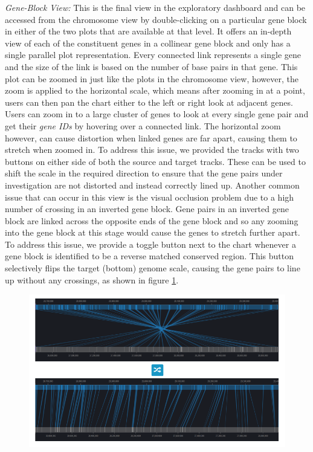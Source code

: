 \textit{Gene-Block View:} This is the final view in the exploratory dashboard and can be accessed from the chromosome view by double-clicking on a particular gene block in either of the two plots that are available at that level. It offers an in-depth view of each of the constituent genes in a collinear gene block and only has a single parallel plot representation. Every connected link represents a single gene and the size of the link is based on the number of base pairs in that gene. This plot can be zoomed in just like the plots in the chromosome view, however, the zoom is applied to the horizontal scale, which means after zooming in at a point, users can then pan the chart either to the left or right look at adjacent genes. Users can zoom in to a large cluster of genes to look at every single gene pair and get their \textit{gene IDs} by hovering over a connected link. The horizontal zoom however, can cause distortion when linked genes are far apart, causing them to stretch when zoomed in. To address this issue, we provided the tracks with two buttons on either side of both the source and target tracks. These can be used to shift the scale in the required direction to ensure that the gene pairs under investigation are not distorted and instead correctly lined up. Another common issue that can occur in this view is the visual occlusion problem due to a high number of crossing in an inverted gene block. Gene pairs in an inverted gene block are linked across the opposite ends of the gene block and so any zooming into the gene block at this stage would cause the genes to stretch further apart. To address this issue, we provide a toggle button next to the chart whenever a gene block is identified to be a reverse matched conserved region. This button selectively flips the target (bottom) genome scale, causing the gene pairs to line up without any crossings, as shown in figure \ref{fig:ch_5_block_view_invert}. 

\begin{figure}
  \centering
  \includegraphics[width=1\linewidth]{images/ch_5_block_view_invert.PNG}
  \label{fig:ch_5_block_view_invert}
\end{figure} 


